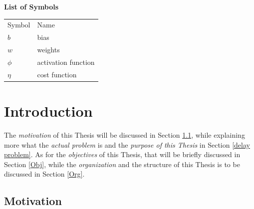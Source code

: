 \documentclass[12pt]{extarticle}
\begin{document}
	\newpage
	\LARGE{\textbf{List of Symbols}}\\ \vspace{1cm}
	\large{}
	\begin{center}
		\begin{tabular}{l l}
			{Symbol} & {Name} \\
			$b$ & bias\\
			$w$ & weights\\
			$\phi$ & activation function\\
			$\eta$ & cost function
		\end{tabular}
	\end{center}
	
	
	\newpage
	\large{}
	\section{Introduction}
	The \emph{motivation} of this Thesis will be discussed in Section \ref{Motiv}, while explaining more what the \emph{actual problem} is and the \emph{purpose of this Thesis} in Section \ref{delay problem}. As for the \emph{objectives} of this Thesis, that will be briefly discussed in Section \ref{Obj}, while the \emph{organization} and the structure of this Thesis is to be discussed in Section \ref{Org}.
	\subsection{Motivation}\label{Motiv}
	
\end{document}
